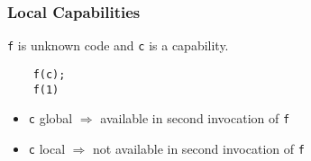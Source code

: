 \documentclass{beamer}
\begin{document}



\begin{frame}[fragile]
  \frametitle{Local Capabilities}
  \texttt{f} is unknown code and \texttt{c} is a capability.
  \begin{lstlisting}
    f(c);
    f(1)
  \end{lstlisting}
  \begin{itemize}
  \item<2-> \texttt{c} global $\Rightarrow$ available in second invocation of \texttt{f}

  \item<3-> \texttt{c} local $\Rightarrow$ not available in second invocation of \texttt{f}
  \end{itemize}


\end{frame}
\end{document}
